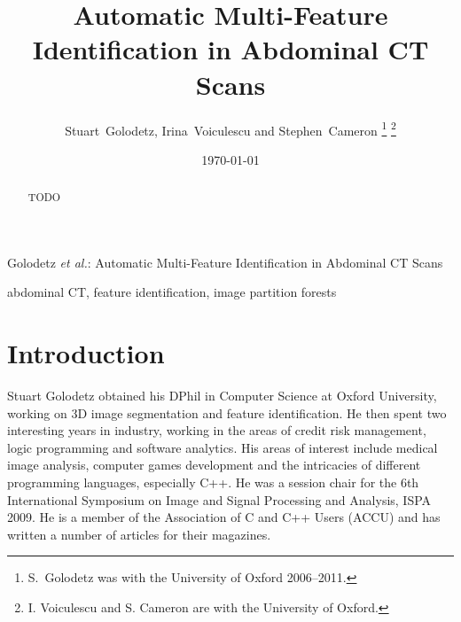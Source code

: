 \documentclass[10pt,twocolumn,twoside]{IEEEtran}
\begin{document}
\title{Automatic Multi-Feature Identification in Abdominal CT Scans}

\author{Stuart~Golodetz, Irina~Voiculescu and Stephen~Cameron%
\thanks{S.~Golodetz was with the University of Oxford 2006--2011.}%
\thanks{I. Voiculescu and S. Cameron are with the University of Oxford.}}

\date{\today}

%
{Golodetz \MakeLowercase{\textit{et al.}}: Automatic Multi-Feature Identification in Abdominal CT Scans}


\maketitle

\begin{abstract}
\noindent TODO
\end{abstract}

\begin{IEEEkeywords}
abdominal CT, feature identification, image partition forests
\end{IEEEkeywords}

\IEEEpeerreviewmaketitle

\section{Introduction}

\IEEEpubidadjcol

\clearpage




\vspace{1cm}

\begin{IEEEbiography}{Stuart Golodetz}
obtained his DPhil in Computer Science at Oxford University, working on 3D image segmentation and feature identification. He then spent two interesting years in industry, working in the areas of credit risk management, logic programming and software analytics. His areas of interest include medical image analysis, computer games development and the intricacies of different programming languages, especially C++. He was a session chair for the 6th International Symposium on Image and Signal Processing and Analysis, ISPA 2009. He is a member of the Association of C and C++ Users (ACCU) and has written a number of articles for their magazines.
\end{IEEEbiography}
\end{document}
